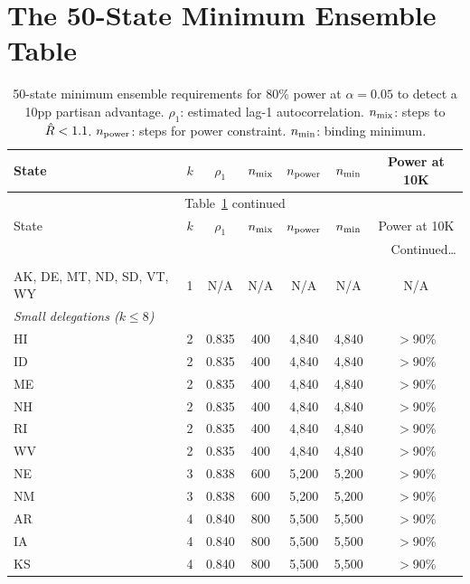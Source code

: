 \section{The 50-State Minimum Ensemble Table}
\label{sec:table}

\begin{longtable}{llccccc}
\caption{50-state minimum ensemble requirements for 80\% power at $\alpha = 0.05$
         to detect a 10pp partisan advantage. $\rho_1$: estimated lag-1
         autocorrelation. $n_{\rm mix}$: steps to $\hat{R} < 1.1$. $n_{\rm power}$:
         steps for power constraint. $n_{\rm min}$: binding minimum.}
\label{tab:state-table} \\
\toprule
State & $k$ & $\rho_1$ & $n_{\rm mix}$ & $n_{\rm power}$ & $n_{\rm min}$ & Power at 10K \\
\midrule
\endfirsthead
\multicolumn{7}{c}{Table~\ref{tab:state-table} continued} \\
\toprule
State & $k$ & $\rho_1$ & $n_{\rm mix}$ & $n_{\rm power}$ & $n_{\rm min}$ & Power at 10K \\
\midrule
\endhead
\midrule
\multicolumn{7}{r}{Continued\ldots} \\
\endfoot
\bottomrule
\endlastfoot
\multicolumn{7}{l}{\textit{Single-district states (no redistricting)}} \\
AK, DE, MT, ND, SD, VT, WY & 1 & N/A & N/A & N/A & N/A & N/A \\
\midrule
\multicolumn{7}{l}{\textit{Small delegations ($k \leq 8$)}} \\
HI &  2 & 0.835 &    400 &    4{,}840 &  4{,}840 & $>$90\% \\
ID &  2 & 0.835 &    400 &    4{,}840 &  4{,}840 & $>$90\% \\
ME &  2 & 0.835 &    400 &    4{,}840 &  4{,}840 & $>$90\% \\
NH &  2 & 0.835 &    400 &    4{,}840 &  4{,}840 & $>$90\% \\
RI &  2 & 0.835 &    400 &    4{,}840 &  4{,}840 & $>$90\% \\
WV &  2 & 0.835 &    400 &    4{,}840 &  4{,}840 & $>$90\% \\
NE &  3 & 0.838 &    600 &    5{,}200 &  5{,}200 & $>$90\% \\
NM &  3 & 0.838 &    600 &    5{,}200 &  5{,}200 & $>$90\% \\
AR &  4 & 0.840 &    800 &    5{,}500 &  5{,}500 & $>$90\% \\
IA &  4 & 0.840 &    800 &    5{,}500 &  5{,}500 & $>$90\% \\
KS &  4 & 0.840 &    800 &    5{,}500 &  5{,}500 & $>$90\% \\

\end{longtable}
